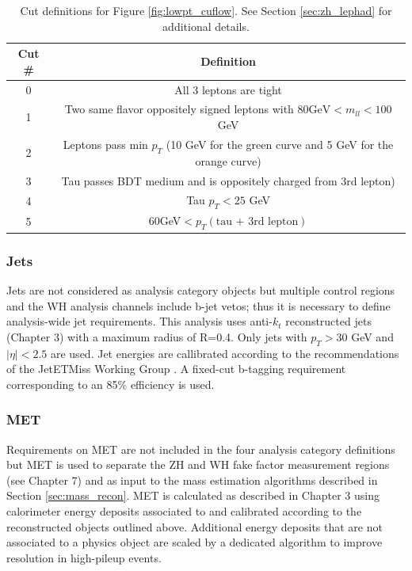\begin{table}[htb!]
    \centering
    \begin{tabular}{|c|c|}
    \hline
    \textbf{Cut \#} & \textbf{Definition}\\
    \hline
    0 & All 3 leptons are tight\\
    1 & Two same flavor oppositely signed leptons with $80\text{GeV}<m_{ll}<100$GeV\\
    2 & Leptons pass min $p_T$ (10 GeV for the green curve and 5 GeV for the orange curve)\\
    3 & Tau passes BDT medium and is oppositely charged from 3rd lepton)\\
    4 & Tau $p_T<25$ GeV\\
    5 & 60GeV$<p_T(\text{tau + 3rd lepton})$\\
    \hline
    \end{tabular}
    \caption{Cut definitions for Figure \ref{fig:lowpt_cuflow}. See Section \ref{sec:zh_lephad} for additional details.}
    \label{tab:lowpt_cutflow}
\end{table}

\subsubsection{Jets}
Jets are not considered as analysis category objects but multiple control regions and the WH analysis channels include b-jet vetos; thus it is necessary to define analysis-wide jet requirements. This analysis uses anti-$k_t$ reconstructed jets (Chapter 3) with a maximum radius of R=0.4. Only jets with $p_T>$30 GeV and $|\eta|<2.5$ are used. Jet energies are callibrated according to the recommendations of the JetETMiss Working Group \cite{jet_met_cp}. A fixed-cut b-tagging requirement corresponding to an 85\% efficiency is used.

\subsubsection{MET}
Requirements on MET are not included in the four analysis category definitions but MET is used to separate the ZH and WH fake factor measurement regions (see Chapter 7) and as input to the mass estimation algorithms described in Section \ref{sec:mass_recon}. MET is calculated as described in Chapter 3 using calorimeter energy deposits associated to and calibrated according to the reconstructed objects outlined above. Additional energy deposits that are not associated to a physics object are scaled by a dedicated algorithm to improve resolution in high-pileup events.

